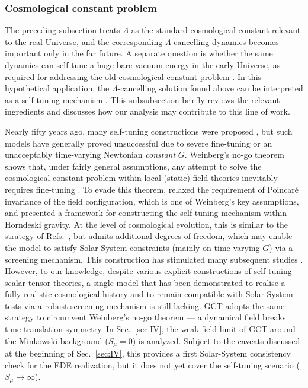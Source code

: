 \documentclass[aps,prd,twocolumn]{revtex4-2}
\begin{document}
\subsubsection{Cosmological constant problem}
The preceding subsection treats $\Lambda$ as the standard cosmological constant relevant to the real Universe, and the corresponding $\Lambda$-cancelling dynamics becomes important only in the far future. A separate question is whether the same dynamics can self-tune a huge bare vacuum energy in the early Universe, as required for addressing the old cosmological constant problem \cite{Zeldovich1967.SovPhysJETP.6.316,Weinberg1989.RMP.61.1,Carroll2001.LRR.4.1}. In this hypothetical application, the $\Lambda$-cancelling solution found above can be interpreted as a self-tuning mechanism \cite{Dolgov1985.JETPLett.41.345,Ford1987.PRD.35.2339,Charmousis2012.PRL.108.051101}. This subsubsection briefly reviews the relevant ingredients and discusses how our analysis may contribute to this line of work.

Nearly fifty years ago, many self-tuning constructions were proposed \cite{Dolgov1985.JETPLett.41.345,Ford1987.PRD.35.2339,Peccei1987.PLB.195.183,Barr1988}, but such models have generally proved unsuccessful due to severe fine-tuning or an unacceptably time-varying Newtonian \textit{constant} $G$. Weinberg's no-go theorem shows that, under fairly general assumptions, any attempt to solve the cosmological constant problem within local (static) field theories inevitably requires fine-tuning \cite{Weinberg1989.RMP.61.1}. To evade this theorem, \citet{Charmousis2012.PRL.108.051101,Charmousis2012.PRD.85.104040} relaxed the requirement of Poincar\'e invariance of the field configuration, which is one of Weinberg's key assumptions, and presented a framework for constructing the self-tuning mechanism within Horndeski gravity. At the level of cosmological evolution, this is similar to the strategy of Refs.~\cite{Dolgov1985.JETPLett.41.345,Ford1987.PRD.35.2339}, but admits additional degrees of freedom, which may enable the model to satisfy Solar System constraints (mainly on time-varying $G$) via a screening mechanism. This construction has stimulated many subsequent studies \cite{Bruneton2012,Copeland2012,Linder2013.JCAP.12.032,MartinMoruno2015.PRD.91.084029,Babichev2017,Khan2022.JCAP.10.075}. However, to our knowledge, despite various explicit constructions of self-tuning scalar-tensor theories, a single model that has been demonstrated to realise a fully realistic cosmological history and to remain compatible with Solar System tests via a robust screening mechanism is still lacking. GCT adopts the same strategy to circumvent Weinberg's no-go theorem --- a dynamical field breaks time-translation symmetry. In Sec.~\ref{sec:IV}, the weak-field limit of GCT around the Minkowski background ($S_\mu=0$) is analyzed. Subject to the caveats discussed at the beginning of Sec.~\ref{sec:IV}, this provides a first Solar-System consistency check for the EDE realization, but it does not yet cover the self-tuning scenario ($S_\mu\rightarrow\infty$).
\end{document}
